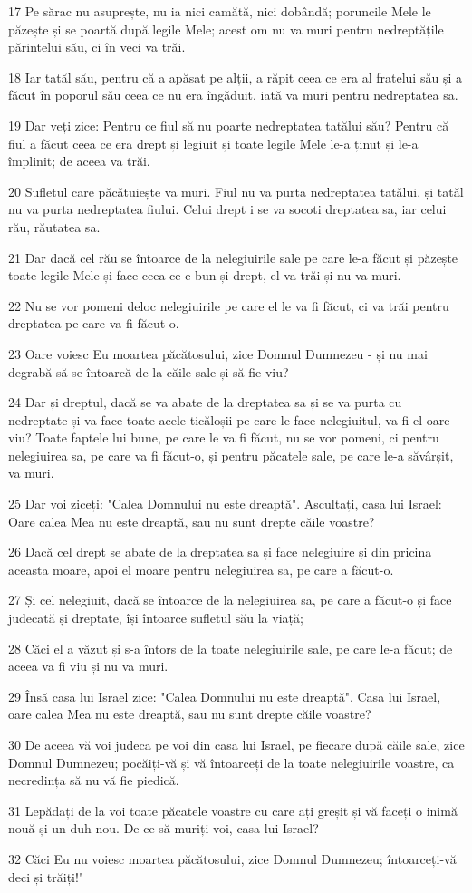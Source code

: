 \par 17 Pe sărac nu asuprește, nu ia nici camătă, nici dobândă; poruncile Mele le păzește și se poartă după legile Mele; acest om nu va muri pentru nedreptățile părintelui său, ci în veci va trăi.
\par 18 Iar tatăl său, pentru că a apăsat pe alții, a răpit ceea ce era al fratelui său și a făcut în poporul său ceea ce nu era îngăduit, iată va muri pentru nedreptatea sa.
\par 19 Dar veți zice: Pentru ce fiul să nu poarte nedreptatea tatălui său? Pentru că fiul a făcut ceea ce era drept și legiuit și toate legile Mele le-a ținut și le-a împlinit; de aceea va trăi.
\par 20 Sufletul care păcătuiește va muri. Fiul nu va purta nedreptatea tatălui, și tatăl nu va purta nedreptatea fiului. Celui drept i se va socoti dreptatea sa, iar celui rău, răutatea sa.
\par 21 Dar dacă cel rău se întoarce de la nelegiuirile sale pe care le-a făcut și păzește toate legile Mele și face ceea ce e bun și drept, el va trăi și nu va muri.
\par 22 Nu se vor pomeni deloc nelegiuirile pe care el le va fi făcut, ci va trăi pentru dreptatea pe care va fi făcut-o.
\par 23 Oare voiesc Eu moartea păcătosului, zice Domnul Dumnezeu - și nu mai degrabă să se întoarcă de la căile sale și să fie viu?
\par 24 Dar și dreptul, dacă se va abate de la dreptatea sa și se va purta cu nedreptate și va face toate acele ticăloșii pe care le face nelegiuitul, va fi el oare viu? Toate faptele lui bune, pe care le va fi făcut, nu se vor pomeni, ci pentru nelegiuirea sa, pe care va fi făcut-o, și pentru păcatele sale, pe care le-a săvârșit, va muri.
\par 25 Dar voi ziceți: "Calea Domnului nu este dreaptă". Ascultați, casa lui Israel: Oare calea Mea nu este dreaptă, sau nu sunt drepte căile voastre?
\par 26 Dacă cel drept se abate de la dreptatea sa și face nelegiuire și din pricina aceasta moare, apoi el moare pentru nelegiuirea sa, pe care a făcut-o.
\par 27 Și cel nelegiuit, dacă se întoarce de la nelegiuirea sa, pe care a făcut-o și face judecată și dreptate, își întoarce sufletul său la viață;
\par 28 Căci el a văzut și s-a întors de la toate nelegiuirile sale, pe care le-a făcut; de aceea va fi viu și nu va muri.
\par 29 Însă casa lui Israel zice: "Calea Domnului nu este dreaptă". Casa lui Israel, oare calea Mea nu este dreaptă, sau nu sunt drepte căile voastre?
\par 30 De aceea vă voi judeca pe voi din casa lui Israel, pe fiecare după căile sale, zice Domnul Dumnezeu; pocăiți-vă și vă întoarceți de la toate nelegiuirile voastre, ca necredința să nu vă fie piedică.
\par 31 Lepădați de la voi toate păcatele voastre cu care ați greșit și vă faceți o inimă nouă și un duh nou. De ce să muriți voi, casa lui Israel?
\par 32 Căci Eu nu voiesc moartea păcătosului, zice Domnul Dumnezeu; întoarceți-vă deci și trăiți!"

